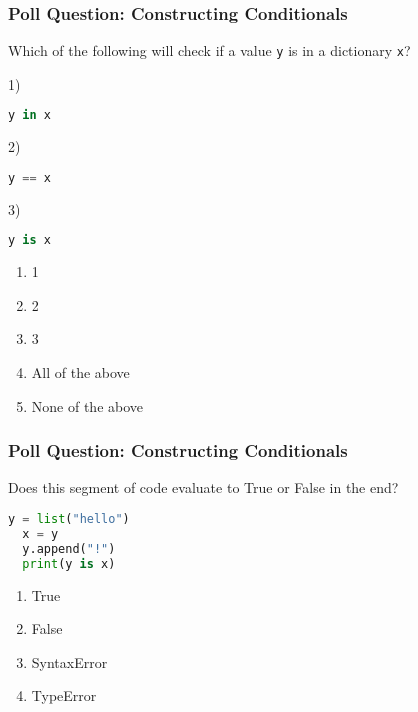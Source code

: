 \documentclass{beamer}
\begin{document}
%
%
\begin{frame}[fragile]
	\frametitle{Poll Question: Constructing Conditionals}
  Which of the following will check if a value \lstinline|y| is in a dictionary \lstinline|x|?
	\begin{minipage}{0.69\textwidth}
    1)
		\begin{lstlisting}[language=Python, autogobble,basicstyle=\tiny,numbers=none]
    y in x
		\end{lstlisting}
    \vspace{1cm}
    2)
		\begin{lstlisting}[language=Python, autogobble,basicstyle=\tiny,numbers=none]
    y == x
		\end{lstlisting}
    \vspace{1cm}
    3)
		\begin{lstlisting}[language=Python, autogobble,basicstyle=\tiny,numbers=none]
    y is x
		\end{lstlisting}
	\end{minipage}
	\begin{minipage}{0.29\textwidth}
    \begin{enumerate}[A]
      \item 1
      \item 2
      \item 3
      \item All of the above
      \item None of the above
    \end{enumerate}
	\end{minipage}
\end{frame}

%
%
\begin{frame}[fragile]
	\frametitle{Poll Question: Constructing Conditionals}
  Does this segment of code evaluate to True or False in the end?
  \begin{lstlisting}[language=Python, autogobble,basicstyle=\tiny,numbers=none]
  y = list("hello")
  x = y
  y.append("!")
  print(y is x)
  \end{lstlisting}
  \vfill
  \begin{enumerate}[A]
    \item True
    \item False
    \item SyntaxError
    \item TypeError
  \end{enumerate}
\end{frame}
\end{document}
